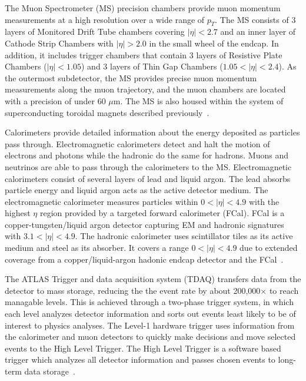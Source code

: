 The Muon Spectrometer (MS) precision chambers provide muon momentum measurements at a high resolution over a wide range of $p_T$. The MS consists of $3$ layers of Monitored Drift Tube chambers covering $|\eta| < 2.7$ and an inner layer of Cathode Strip Chambers with $|\eta| > 2.0$ in the small wheel of the endcap. In addition, it includes trigger chambers that contain $3$ layers of Resistive Plate Chambers ($|\eta| < 1.05$) and $3$ layers of Thin Gap Chambers ($1.05 < |\eta| < 2.4$). As the outermost subdetector, the MS provides precise muon momentum measurements along the muon trajectory, and the muon chambers are located with a precision of under $60$ $\mu$m. The MS is also housed within the system of superconducting toroidal magnets described previously~\cite{detector}. 

Calorimeters provide detailed information about the energy deposited as particles pass through. Electromagnetic calorimeters detect and halt the motion of electrons and photons while the hadronic do the same for hadrons. Muons and neutrinos are able to pass through the calorimeters to the MS. Electromagnetic calorimeters consist of several layers of lead and liquid argon. The lead absorbs particle energy and liquid argon acts as the active detector medium. The electromagnetic calorimeter measures particles within $0<|\eta|<4.9$ with the highest $\eta$ region provided by a targeted forward calorimeter (FCal). FCal is a copper-tungsten/liquid argon detector capturing EM and hadronic signatures with $3.1<|\eta|<4.9$. The hadronic calorimeter uses scintillator tiles as its active medium and steel as its absorber. It covers a range $0<|\eta|<4.9$ due to extended coverage from a copper/liquid-argon hadonic endcap detector and the FCal~\cite{detector}. 

The ATLAS Trigger and data acquisition system (TDAQ) transfers data from the detector to mass storage, reducing the the event rate by about 200,000$\times$ to reach managable levels. This is achieved through a two-phase trigger system, in which each level analyzes detector information and sorts out events least likely to be of interest to physics analyses. The Level-1 hardware trigger uses information from the calorimeter and muon detectors to quickly make decisions and move selected events to the High Level Trigger. The High Level Trigger is a software based trigger which analyzes all detector information and passes chosen events to long-term data storage~\cite{TDAQ}. 

